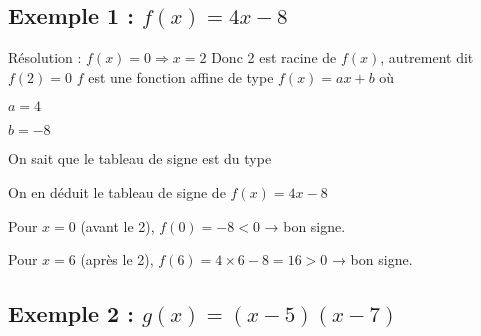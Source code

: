 \documentclass[a4paper,12pt]{article}
\begin{document}
    \vspace{1em}
    
    \subsection*{Exemple 1 : $f(x) = 4x - 8$}
    
    Résolution : $f(x) = 0 \Rightarrow x = 2$
    Donc 2 est racine de $f(x)$, autrement dit $f(2) = 0$
    \vspace{1em}
    $f$ est une fonction affine de type $f(x) = ax + b$ où 
    \begin{compactitem}
        \item $a = 4$
        \item $b = -8$
    \end{compactitem}
    
    \vspace{1em}
    
    On sait que le tableau de signe est du type 
    
    \vspace{1em}
    
    
    \vspace{1em}
    
    On en déduit le tableau de signe de $f(x) = 4x - 8$

    \vspace{1em}

    
    \vspace{1em}
\begin{compactitem}
    \item Pour \(x = 0\) (avant le 2), \(f(0) = -8 < 0\) → bon signe.
    \item Pour \(x = 6\) (après le 2), \(f(6) = 4 \times 6 - 8 = 16 > 0\) → bon signe.
\end{compactitem}

    \subsection*{Exemple 2 : $g(x) = (x - 5)(x - 7)$}
    
\end{document}
